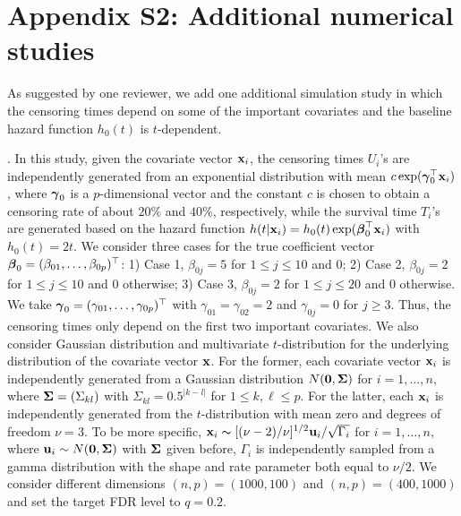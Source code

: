 \documentclass[11pt]{article}
\newcommand{\bSigma}{\mbox{\boldmath $\Sigma$}}
\def\bx{{\bf x}}
\def\u{{\bf u}}
\newcommand{\bbeta}{\mbox{\boldmath $\beta$}}
\newcommand{\bgamma}{\mbox{\boldmath $\gamma$}}
\begin{document}
	\section*{Appendix S2: Additional numerical studies}\label{App: S2}
	
	
	As suggested by one reviewer, we add one additional simulation study in which the censoring times depend on some of the important covariates and the baseline hazard function $h_0(t)$ is $t$-dependent. 
	
	
	. In this study, given the covariate vector $\bx_i$, the censoring times $U_i$'s are independently generated from an exponential distribution with mean $c\exp(\bgamma_0^{\top}\bx_i)$, where $\bgamma_0$ is a $p$-dimensional vector and 
	the constant $c$ is chosen to obtain a censoring rate of about $20\%$ and $40\%$, respectively, while the survival time 
	$T_i$'s are generated based on the hazard function
	$h(t|\bx_i) = h_0(t)\exp(\bbeta_0^{\top}\bx_i)$ with $h_0(t)=2t$.   
	We consider three cases for the true coefficient vector $\bbeta_0=(\beta_{01}, \ldots, \beta_{0p})^{\top}$:
	1) Case 1, $\beta_{0j}=5$ for $1\leq j\leq 10$ and $0$; 2) Case 2, $\beta_{0j}=2$ for $1\leq j\leq 10$ and $0$ otherwise; 3) Case 3, $\beta_{0j}=2$ for $1\leq j\leq 20$ and $0$ otherwise.
	We take $\bgamma_0=(\gamma_{01}, \ldots, \gamma_{0p})^{\top}$ with $\gamma_{01}=\gamma_{02}=2$ and $\gamma_{0j}=0$ for $j\geq 3$. Thus, the censoring times only depend on the first two important covariates.  
	We also consider Gaussian distribution and multivariate $t$-distribution for the underlying distribution of the covariate vector $\bx$. For the former, each covariate vector $\bx_i$ is independently generated from a Gaussian distribution $N(\mathbf{0},\bSigma)$ for $i=1, \ldots, n$, where $\bSigma=(\Sigma_{kl})$ with $\Sigma_{kl}=0.5^{|k-l|}$ for $1\leq k, \ell\leq p$. For the latter, each $\bx_i$ is independently generated from the $t$-distribution with mean zero and degrees of freedom $\nu=3$. To be more specific,  
	$\bx_i\thicksim [(\nu-2)/\nu]^{1/2}\u_i/\sqrt{\Gamma_i}$ for $i=1, \ldots, n$,
	where $\u_i\sim N(\textbf{0}, \bSigma)$ with $\bSigma$ given before,
	$\Gamma_i$ is independently sampled from a gamma distribution with the shape and rate parameter both equal to $\nu/2$. We consider different dimensions $(n, p)=(1000, 100)$ and $(n, p)=(400, 1000)$ and set the target FDR level to $q=0.2$.
	
	

	
	
\end{document}
